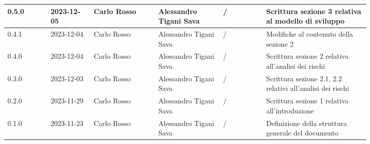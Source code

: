 {\begin{longtable}{p{0.10\linewidth}p{0.10\linewidth}p{0.15\linewidth}p{0.15\linewidth}p{0.10\linewidth}p{0.24\linewidth}}
	  \hline
	  0.5.0             & 2023-12-05    & Carlo Rosso            & Alessandro Tigani Sava & /                    & Scrittura sezione 3 relativa al modello di sviluppo                      \\
	  \hline
	  0.4.1             & 2023-12-04    & Carlo Rosso            & Alessandro Tigani Sava & /                    & Modifiche al contenuto della sezione 2                                   \\
	  \hline
	  0.4.0             & 2023-12-04    & Carlo Rosso            & Alessandro Tigani Sava & /                    & Scrittura sezione 2 relativa all'analisi dei rischi                      \\
	  \hline
	  0.3.0             & 2023-12-03    & Carlo Rosso            & Alessandro Tigani Sava & /                    & Scrittura sezione 2.1, 2.2 relativi all'analisi dei rischi               \\
	  \hline
	  0.2.0             & 2023-11-29    & Carlo Rosso            & Alessandro Tigani Sava & /                    & Scrittura sezione 1 relativa all'introduzione                            \\
	  \hline
	  0.1.0             & 2023-11-23    & Carlo Rosso            & Alessandro Tigani Sava & /                    & Definizione della struttura generale del documento                       \\
	  \bottomrule
  \end{longtable}
 }
